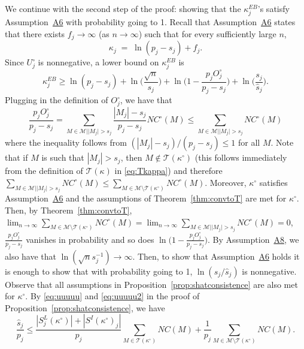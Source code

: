 \documentclass[bj,authoryear]{imsart}
\theoremstyle{plain}
\newcommand{\M}{\mathcal{M}}
\newcommand{\T}{\mathcal{T}}
\begin{document}
We continue with the second step of the proof: showing that the $\kappa^{EB}_j$'s satisfy Assumption~\hyperlink{lab:A6}{A6} with probability going to 1. Recall that Assumption~\hyperlink{lab:A6}{A6} states that there exists $f_j\to \infty$ (as $n\to \infty$) such that for every sufficiently large $n$,
\begin{equation*}
    \kappa_j \;=\;\ln(p_j-s_j) + f_j.
\end{equation*}
Since $U_j^{\circ}$ is nonnegative, a lower bound on $\kappa^{EB}_j$ is %
\begin{equation}\label{eq:decompstep2pen2}
    \kappa^{EB}_j
    \geq  \ln(p_j-s_j)+\ln\Big(\frac{\sqrt{n}}{s_j}\Big)+\ln\Big(1-\frac{p_j O^{\circ}_j}{p_j-s_j}\Big)+\ln\Big(\frac{s_j}{\hat{s}_j}\Big).
\end{equation}
Plugging in the definition of $O^{\circ}_j$, we have that
$$\frac{p_j O^{\circ}_j}{p_j-s_j} =  \sum_{M \in \M | |M_j| > s_j}\frac{|M_j|-s_j}{p_j-s_j}NC^{\circ}(M)\leq \sum_{M \in \M | |M_j| > s_j}NC^{\circ}(M)$$
where the inequality follows from $(|M_j|-s_j)/(p_j-s_j)\leq 1$ for all $M$.
Note that if $M$ is such that $|M_j|>s_j$, then $M\not\in\T(\kappa^{\circ})$ (this follows immediately from the definition of $\T(\kappa)$ in \eqref{eq:Tkappa})  and therefore $\sum_{M \in \M | |M_j| > s_j}NC^{\circ}(M)\leq \sum_{M \in \M \setminus \T(\kappa^{\circ})}NC^{\circ}(M)$. Moreover, $\kappa^{\circ}$ satisfies Assumption~\hyperlink{lab:A6}{A6} and the assumptions of Theorem~\ref{thm:convtoT} are met for $\kappa^{\circ}$.
Then, by Theorem~\ref{thm:convtoT}, $\lim_{n\to\infty} \sum_{M \in \M \setminus \T(\kappa^{\circ})}NC^{\circ}(M)=\lim_{n\to\infty}\sum_{M \in \M | |M_j| > s_j}NC^{\circ}(M) = 0$, $\frac{p_j O^{\circ}_j}{p_j-s_j}$ vanishes in probability and so does $\ln\Big(1-\frac{p_j O^{\circ}_j}{p_j-s_j}\Big)$. By Assumption~\hyperlink{lab:A8}{A8}, we also have that $\ln(\sqrt{n}s_j^{-1})\to\infty$. 
Then, to show that Assumption~\hyperlink{lab:A6}{A6} holds it is enough to show that with probability going to 1, $\ln(s_j/\hat{s}_j)$ is nonnegative. Observe that all assumptions in Proposition~\ref{prop:shatconsistence} are also met for $\kappa^{\circ}$. By \eqref{eq:uuuuu} and \eqref{eq:uuuuu2} in the proof of Proposition~\ref{prop:shatconsistence}, we have
\begin{equation*}
    \frac{\hat{s}_j}{p_j}\leq \frac{|S^{L}_j(\kappa^{\circ})|+|S^{I}(\kappa^{\circ})_j|}{p_j}\sum_{M \in \T(\kappa^{\circ})}NC(M) + \frac{1}{p_j} \sum_{M \in \M\setminus \T(\kappa^{\circ})}NC(M).
\end{equation*}
\end{document}
